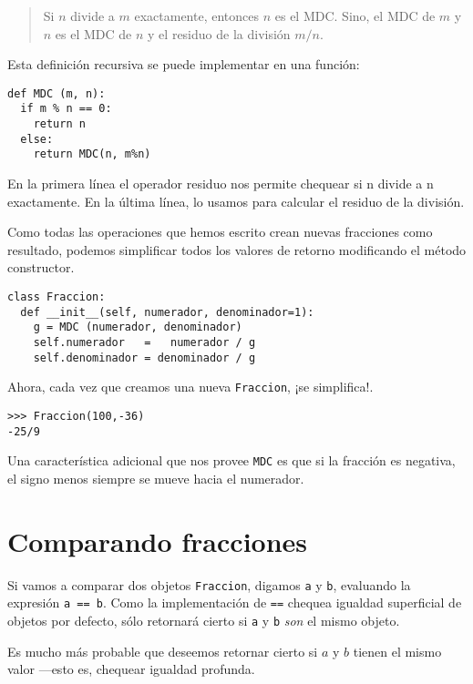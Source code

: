 \begin{quote}
Si  $n$ divide a  $m$ exactamente, entonces $n$ es el MDC. Sino,
el MDC de $m$ y $n$ es el MDC de $n$ y el residuo de la división 
 $m/n$.
\end{quote}

Esta definición recursiva se puede implementar en una función:

\beforeverb
\begin{verbatim}
def MDC (m, n):
  if m % n == 0:
    return n
  else:
    return MDC(n, m%n)
\end{verbatim}
\afterverb
%
En la primera línea el operador residuo nos permite chequear
si n divide a n exactamente. En la última línea, lo usamos
para calcular el residuo de la división.

Como todas las operaciones que hemos escrito crean nuevas
fracciones como resultado, podemos simplificar todos los 
valores de retorno modificando el método constructor.

\beforeverb
\begin{verbatim}
class Fraccion:
  def __init__(self, numerador, denominador=1):
    g = MDC (numerador, denominador)
    self.numerador   =   numerador / g
    self.denominador = denominador / g
\end{verbatim}
\afterverb
%
Ahora, cada vez que creamos una nueva  \texttt{Fraccion}, ¡se
simplifica!.

\beforeverb
\begin{verbatim}
>>> Fraccion(100,-36)
-25/9
\end{verbatim}
\afterverb
%
Una característica adicional que nos provee  \texttt{MDC} 
es que si la fracción es negativa, el signo menos siempre 
se mueve hacia el numerador.


\section{Comparando fracciones}

Si vamos a comparar dos objetos  \texttt{Fraccion}, digamos 
\texttt{a} y \texttt{b}, evaluando la expresión \texttt{a == b}. 
Como la implementación de  \texttt{==} chequea igualdad superficial
de objetos por defecto, sólo retornará cierto si  \texttt{a}
y \texttt{b} \textit{son} el mismo objeto.

Es mucho más probable que deseemos retornar cierto si  $a$ y $b$ 
tienen el mismo valor ---esto es, chequear igualdad profunda.

